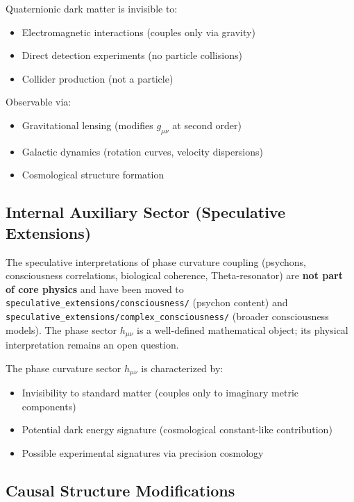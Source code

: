 Quaternionic dark matter is invisible to:
\begin{itemize}
    \item Electromagnetic interactions (couples only via gravity)
    \item Direct detection experiments (no particle collisions)
    \item Collider production (not a particle)
\end{itemize}

Observable via:
\begin{itemize}
    \item Gravitational lensing (modifies $g_{\mu\nu}$ at second order)
    \item Galactic dynamics (rotation curves, velocity dispersions)
    \item Cosmological structure formation
\end{itemize}

\subsection{Internal Auxiliary Sector (Speculative Extensions)}

\begin{tcolorbox}[colback=red!5!white,colframe=red!75!black,title=Speculative Content — Quarantined]
The speculative interpretations of phase curvature coupling (psychons, consciousness correlations,
biological coherence, Theta-resonator) are \textbf{not part of core physics} and have been
moved to \texttt{speculative\_extensions/consciousness/} (psychon content) and
\texttt{speculative\_extensions/complex\_consciousness/} (broader consciousness models).
The phase sector $h_{\mu\nu}$ is a well-defined mathematical object; its physical interpretation
remains an open question.
\end{tcolorbox}

The phase curvature sector $h_{\mu\nu}$ is characterized by:
\begin{itemize}
  \item Invisibility to standard matter (couples only to imaginary metric components)
  \item Potential dark energy signature (cosmological constant-like contribution)
  \item Possible experimental signatures via precision cosmology
\end{itemize}

\subsection{Causal Structure Modifications}

